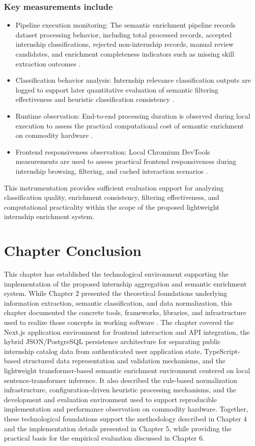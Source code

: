 \subsubsection*{Key measurements include}
\begin{itemize}
\item Pipeline execution monitoring: The semantic enrichment pipeline records dataset processing behavior, including total processed records, accepted internship classifications, rejected non-internship records, manual review candidates, and enrichment completeness indicators such as missing skill extraction outcomes \cite{wohlin2012experimentation}.
\item Classification behavior analysis: Internship relevance classification outputs are logged to support later quantitative evaluation of semantic filtering effectiveness and heuristic classification consistency \cite{wohlin2012experimentation}.
\item Runtime observation: End-to-end processing duration is observed during local execution to assess the practical computational cost of semantic enrichment on commodity hardware \cite{jain1991art}.
\item Frontend responsiveness observation: Local Chromium DevTools measurements are used to assess practical frontend responsiveness during internship browsing, filtering, and cached interaction scenarios \cite{jain1991art}.
\end{itemize}
This instrumentation provides sufficient evaluation support for analyzing classification quality, enrichment consistency, filtering effectiveness, and computational practicality within the scope of the proposed lightweight internship enrichment system.
\section{Chapter Conclusion}
This chapter has established the technological environment supporting the implementation of the proposed internship aggregation and semantic enrichment system. While Chapter 2 presented the theoretical foundations underlying information extraction, semantic classification, and data normalization, this chapter documented the concrete tools, frameworks, libraries, and infrastructure used to realize those concepts in working software \cite{hevner2004design, bass2012software}.
The chapter covered the Next.js application environment for frontend interaction and API integration, the hybrid JSON/PostgreSQL persistence architecture for separating public internship catalog data from authenticated user application state, TypeScript-based structured data representation and validation mechanisms, and the lightweight transformer-based semantic enrichment environment centered on local sentence-transformer inference.
It also described the rule-based normalization infrastructure, configuration-driven heuristic processing mechanisms, and the development and evaluation environment used to support reproducible implementation and performance observation on commodity hardware.
Together, these technological foundations support the methodology described in Chapter 4 and the implementation details presented in Chapter 5, while providing the practical basis for the empirical evaluation discussed in Chapter 6.
